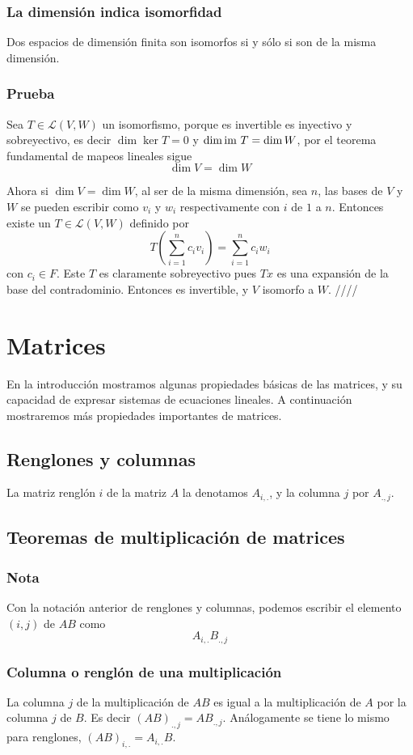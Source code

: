 \documentclass{article}
\begin{document}
\subsubsection{La dimensión indica isomorfidad}
Dos espacios de dimensión finita son isomorfos
si y sólo si son de la misma dimensión.
\subsubsection*{Prueba}
Sea $T\in\mathcal{L}(V,W)$ un isomorfismo, porque es invertible es 
inyectivo y sobreyectivo, es decir $\dim\ker T = 0$ y
$\dim\text{im } T = \dim W$, por el teorema fundamental de mapeos lineales
sigue $$\dim V = \dim W$$

Ahora si $\dim V = \dim W$, al ser de la misma dimensión, sea $n$, las 
bases de $V$ y $W$ se pueden escribir como $v_i$ y $w_i$ 
respectivamente con $i$ de $1$ a $n$. Entonces existe un 
$T\in\mathcal{L}(V,W)$ definido por
$$T\left(\sum^n_{i=1}c_i v_i\right) = \sum^n_{i=1}c_i w_i$$
con $c_i\in F$. Este $T$ es claramente sobreyectivo pues $Tx$ es una
expansión de la base del contradominio. Entonces es invertible, y
$V$ isomorfo a $W$. \hfill ////

\newpage

\section{Matrices}
En la introducción mostramos algunas propiedades básicas de las
matrices, y su capacidad de expresar sistemas de ecuaciones lineales.
A continuación mostraremos más propiedades importantes de matrices.

\subsection{Renglones y columnas}
La matriz renglón $i$ de la matriz $A$ la denotamos
$A_{i,.}$, y la columna $j$ por $A_{.,j}$.

\subsection{Teoremas de multiplicación de matrices}
\subsubsection*{Nota}
Con la notación anterior de renglones y columnas, podemos
escribir el elemento $(i,j)$ de $AB$ como
$$A_{i,.} B_{.,j}$$

\subsubsection{Columna o renglón de una multiplicación}
La columna $j$ de la multiplicación de $AB$ es igual a la
multiplicación de $A$ por la columna $j$ de $B$. Es decir
$(AB)_{.,j} = A B_{.,j}$. Análogamente se tiene lo mismo para renglones,
$(AB)_{i,.} = A_{i,.} B$.
\end{document}
